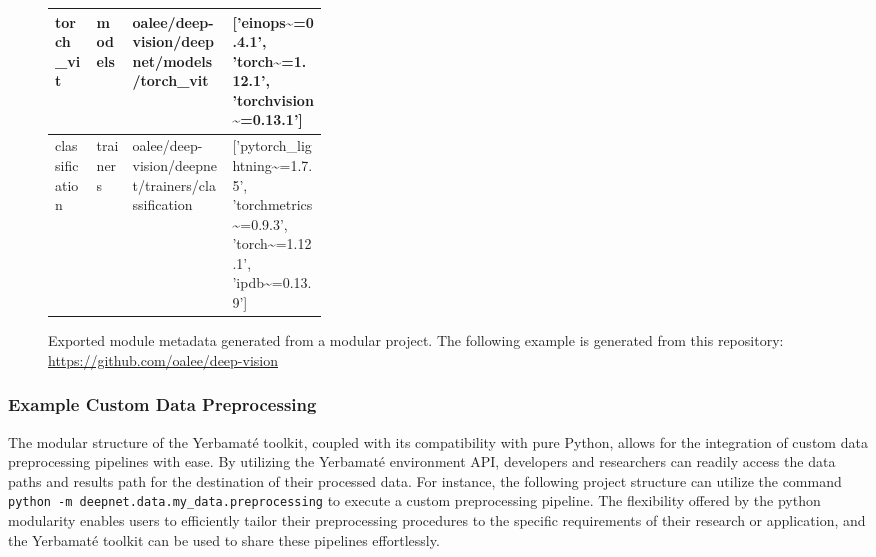 \begin{figure}[H]
\begin{tabular}{|l|l|l|p{0.35\linewidth}|}
  \hline 
 torch\_vit      & models      & oalee/deep-vision/deepnet/models/torch\_vit         & ['einops\textasciitilde{}=0.4.1', 'torch\textasciitilde{}=1.12.1', 'torchvision\textasciitilde{}=0.13.1']                                                                                                                                                                                                                                                                                    \\
  \hline 
 classification & trainers    & oalee/deep-vision/deepnet/trainers/classification  & ['pytorch\_lightning\textasciitilde{}=1.7.5', 'torchmetrics\textasciitilde{}=0.9.3', 'torch\textasciitilde{}=1.12.1', 'ipdb\textasciitilde{}=0.13.9']                                                                                                                                                                                                                                                         \\
\hline

\end{tabular}
   
\caption{Exported module metadata generated from a modular project. The following example is generated from this repository: \url{https://github.com/oalee/deep-vision} }
    \label{fig:my_label}
\end{figure}


\subsubsection{Example Custom Data Preprocessing}
The modular structure of the Yerbamaté toolkit, coupled with its compatibility with pure Python, allows for the integration of custom data preprocessing pipelines with ease. By utilizing the Yerbamaté environment API, developers and researchers can readily access the data paths and results path for the destination of their processed data. For instance, the following project structure can utilize the command \texttt{python -m deepnet.data.my\_data.preprocessing} to execute a custom preprocessing pipeline. The flexibility offered by the python modularity enables users to efficiently tailor their preprocessing procedures to the specific requirements of their research or application, and the Yerbamaté toolkit can be used to share these pipelines effortlessly.


